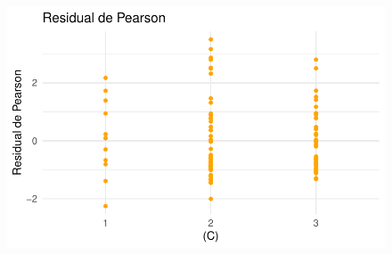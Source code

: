 \documentclass[
  letterpaper,
  DIV=11,
  numbers=noendperiod]{scrartcl}
\begin{document}
\begin{figure}
%
\begin{minipage}{0.50\linewidth}
\includegraphics{Modelos_files/figure-pdf/unnamed-chunk-28-4.pdf}\end{minipage}%

\end{figure}%
\end{document}
